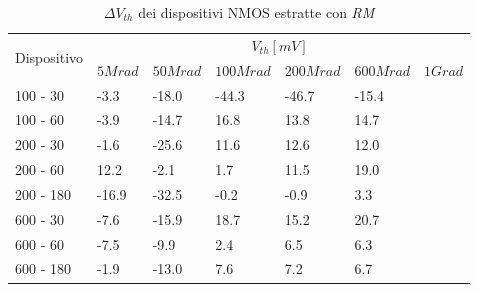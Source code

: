 \documentclass[12pt, letterpaper]{book}
\begin{document}
\begin{table}[H]
  \renewcommand{\arraystretch}{1.3}
  \begin{tabular}{m{2cm}  m{1.1cm} m{1.3cm} m{1.5cm} m{1.5cm} m{1.5cm} m{1cm}}
    \toprule
    \multirow{2}{*}{Dispositivo} & \multicolumn{6}{c}{$V_{th} [mV] $}                                                          \\
    \cmidrule{2-7}
                                 & $5Mrad$                            & $50Mrad$ & $100Mrad$ & $200Mrad$ & $600Mrad$ & $1Grad$ \\
    \midrule
    100 - 30                     & -3.3                               & -18.0    & -44.3     & -46.7     & -15.4     &         \\
    \hline
    100 - 60                     & -3.9                               & -14.7    & 16.8      & 13.8      & 14.7      &         \\
    \hline
    200 - 30                     & -1.6                               & -25.6    & 11.6      & 12.6      & 12.0      &         \\
    \hline
    200 - 60                     & 12.2                               & -2.1     & 1.7       & 11.5      & 19.0      &         \\
    \hline
    200 - 180                    & -16.9                              & -32.5    & -0.2      & -0.9      & 3.3       &         \\
    \hline
    600 - 30                     & -7.6                               & -15.9    & 18.7      & 15.2      & 20.7      &         \\
    \hline
    600 - 60                     & -7.5                               & -9.9     & 2.4       & 6.5       & 6.3       &         \\
    \hline
    600 - 180                    & -1.9                               & -13.0    & 7.6       & 7.2       & 6.7       &         \\
    \bottomrule
  \end{tabular}
  \caption{$\Delta V_{th}$ dei dispositivi NMOS estratte con \emph{RM}}
  \label{tab:deltaVthRMN}
\end{table}
\end{document}
